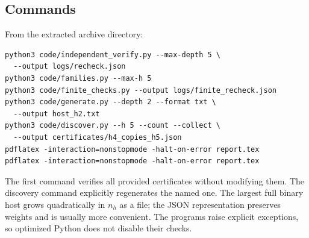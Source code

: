 \documentclass[11pt,a4paper]{article}
\theoremstyle{remark}
\begin{document}
\subsection{Commands}
From the extracted archive directory:
\begin{samepage}
\begin{verbatim}
python3 code/independent_verify.py --max-depth 5 \
  --output logs/recheck.json
python3 code/families.py --max-h 5
python3 code/finite_checks.py --output logs/finite_recheck.json
python3 code/generate.py --depth 2 --format txt \
  --output host_h2.txt
python3 code/discover.py --h 5 --count --collect \
  --output certificates/h4_copies_h5.json
pdflatex -interaction=nonstopmode -halt-on-error report.tex
pdflatex -interaction=nonstopmode -halt-on-error report.tex
\end{verbatim}
\end{samepage}
The first command verifies all provided certificates without modifying
them. The discovery command explicitly regenerates the named one.
The largest full binary host grows quadratically in \(n_h\) as a file;
the JSON representation preserves weights and is usually more convenient.
The programs raise explicit exceptions, so optimized Python does not
disable their checks.
\end{document}
